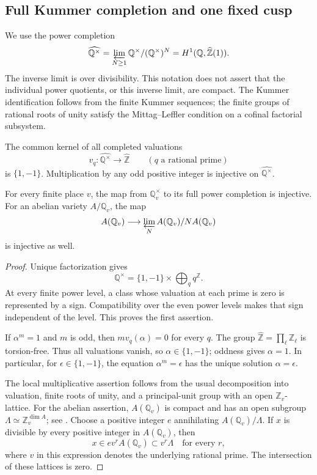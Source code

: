 \subsection{Full Kummer completion and one fixed cusp}

We use the power completion
\begin{equation}
 \widehat{\mathbb Q^\times}
 =\varprojlim_{N\geq1}\mathbb Q^\times/(\mathbb Q^\times)^N
 =H^1(\mathbb Q,\widehat{\mathbb Z}(1)).
 \label{eq:allprime-power-completion}
\end{equation}
The inverse limit is over divisibility.  This notation does not
assert that the individual power quotients, or this inverse limit,
are compact.  The Kummer identification follows from the finite
Kummer sequences; the finite groups of rational roots of unity
satisfy the Mittag--Leffler condition on a cofinal factorial
subsystem.

\begin{lemma}
\label{lem:allprime-kummer}
The common kernel of all completed valuations
\[
 v_q:\widehat{\mathbb Q^\times}\longrightarrow\widehat{\mathbb Z}
 \qquad(q\text{ a rational prime})
\]
is \(\{1,-1\}\).  Multiplication by any odd positive integer is
injective on \(\widehat{\mathbb Q^\times}\).

For every finite place \(v\), the map from
\(\mathbb Q_v^\times\) to its full power completion is injective.
For an abelian variety \(A/\mathbb Q_v\), the map
\[
 A(\mathbb Q_v)\longrightarrow
 \varprojlim_N A(\mathbb Q_v)/N A(\mathbb Q_v)
\]
is injective as well.
\end{lemma}

\begin{proof}
Unique factorization gives
\[
 \mathbb Q^\times=\{1,-1\}\times
                     \bigoplus_q q^{\mathbb Z}.
\]
At every finite power level, a class whose valuation at each prime
is zero is represented by a sign.  Compatibility over the even
power levels makes that sign independent of the level.  This
proves the first assertion.

If \(\alpha^m=1\) and \(m\) is odd, then
\(m v_q(\alpha)=0\) for every \(q\).
The group \(\widehat{\mathbb Z}=\prod_\ell\mathbb Z_\ell\)
is torsion-free.  Thus all valuations vanish, so
\(\alpha\in\{1,-1\}\); oddness gives \(\alpha=1\).
In particular, for \(\epsilon\in\{1,-1\}\), the equation
\(\alpha^m=\epsilon\) has the unique solution
\(\alpha=\epsilon\).

The local multiplicative assertion follows from the usual
decomposition into valuation, finite roots of unity, and a
principal-unit group with an open \(\mathbb Z_v\)-lattice.
For the abelian assertion, \(A(\mathbb Q_v)\) is compact and has
an open subgroup \(\Lambda\simeq\mathbb Z_v^{\dim A}\);
see \citet[Lemma~I.3.3, p.~41]{Milne2006ADT}.
Choose a positive integer \(e\) annihilating
\(A(\mathbb Q_v)/\Lambda\).  If \(x\) is divisible by every
positive integer in \(A(\mathbb Q_v)\), then
\[
 x\in e v^r A(\mathbb Q_v)\subset v^r\Lambda
 \quad\text{for every }r,
\]
where \(v\) in this expression denotes the underlying rational
prime.  The intersection of these lattices is zero.
\end{proof}

